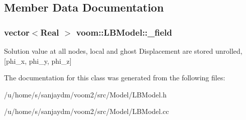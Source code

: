 \subsection{Member Data Documentation}
\hypertarget{classvoom_1_1_l_b_model_a4e7d5fadb92531299a2fe25ec76b7efa}{
\subsubsection[{\_\-field}]{\setlength{\rightskip}{0pt plus 5cm}vector$<$Real $>$ {\bf voom::LBModel::\_\-field}}}
\label{classvoom_1_1_l_b_model_a4e7d5fadb92531299a2fe25ec76b7efa}
Solution value at all nodes, local and ghost Displacement are stored unrolled, \mbox{[}phi\_\-x, phi\_\-y, phi\_\-z\mbox{]} 

The documentation for this class was generated from the following files:\begin{DoxyCompactItemize}
\item 
/u/home/s/sanjaydm/voom2/src/Model/LBModel.h\item 
/u/home/s/sanjaydm/voom2/src/Model/LBModel.cc\end{DoxyCompactItemize}
